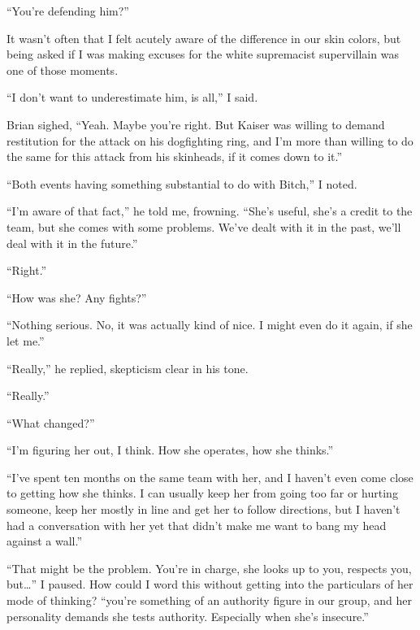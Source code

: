 ``You're defending him?''



It wasn't often that I felt acutely aware of the difference in our skin colors, but being asked if I was making excuses for the white supremacist supervillain was one of those moments.



``I don't want to underestimate him, is all,'' I said.



Brian sighed, ``Yeah.  Maybe you're right.  But Kaiser was willing to demand restitution for the attack on his dogfighting ring, and I'm more than willing to do the same for this attack from his skinheads, if it comes down to it.''



``Both events having something substantial to do with Bitch,'' I noted.



``I'm aware of that fact,'' he told me, frowning.  ``She's useful, she's a credit to the team, but she comes with some problems.  We've dealt with it in the past, we'll deal with it in the future.''



``Right.''



``How was she?  Any fights?''



``Nothing serious.  No, it was actually kind of nice.  I might even do it again, if she let me.''



``Really,'' he replied, skepticism clear in his tone.



``Really.''



``What changed?''



``I'm figuring her out, I think.  How she operates, how she thinks.''



``I've spent ten months on the same team with her, and I haven't even come close to getting how she thinks.  I can usually keep her from going too far or hurting someone, keep her mostly in line and get her to follow directions, but I haven't had a conversation with her yet that didn't make me want to bang my head against a wall.''



``That might be the problem.  You're in charge, she looks up to you, respects you, but\ldots'' I paused.  How could I word this without getting into the particulars of her mode of thinking?  ``\ldotsBut you're something of an authority figure in our group, and her personality demands she tests authority.  Especially when she's insecure.''




